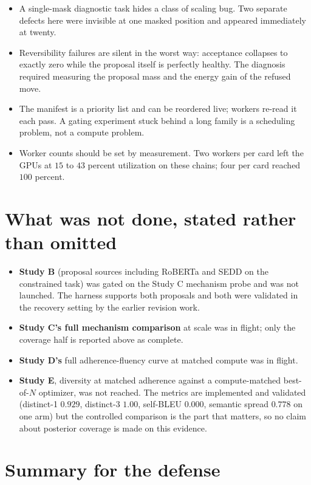 \documentclass[11pt,a4paper]{article}
\begin{document}
\begin{itemize}
\item A single-mask diagnostic task hides a class of scaling bug. Two separate defects
  here were invisible at one masked position and appeared immediately at twenty.
\item Reversibility failures are silent in the worst way: acceptance collapses to exactly
  zero while the proposal itself is perfectly healthy. The diagnosis required measuring
  the proposal mass and the energy gain of the refused move.
\item The manifest is a priority list and can be reordered live; workers re-read it each
  pass. A gating experiment stuck behind a long family is a scheduling problem, not a
  compute problem.
\item Worker counts should be set by measurement. Two workers per card left the GPUs at
  $15$ to $43$ percent utilization on these chains; four per card reached $100$ percent.
\end{itemize}

\section{What was not done, stated rather than omitted}

\begin{itemize}
\item \textbf{Study B} (proposal sources including RoBERTa and SEDD on the constrained
  task) was gated on the Study C mechanism probe and was not launched. The harness
  supports both proposals and both were validated in the recovery setting by the earlier
  revision work.
\item \textbf{Study C's full mechanism comparison} at scale was in flight; only the
  coverage half is reported above as complete.
\item \textbf{Study D's} full adherence-fluency curve at matched compute was in flight.
\item \textbf{Study E}, diversity at matched adherence against a compute-matched
  best-of-$N$ optimizer, was not reached. The metrics are implemented and validated
  (distinct-1 $0.929$, distinct-3 $1.00$, self-BLEU $0.000$, semantic spread $0.778$ on
  one arm) but the controlled comparison is the part that matters, so no claim about
  posterior coverage is made on this evidence.
\end{itemize}

\section{Summary for the defense}
\end{document}
